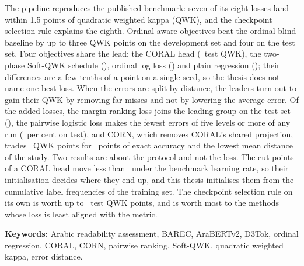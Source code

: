 \documentclass[12pt]{report}
\begin{document}
The pipeline reproduces the published benchmark: seven of its eight losses land within 1.5 points
of quadratic weighted kappa (QWK), and the checkpoint selection rule explains the eighth. Ordinal
aware objectives beat the ordinal-blind baseline by up to three QWK points on the development set
and four on the test set. Four objectives share the lead: the CORAL head (\testQwkCoral\ test
QWK), the two-phase Soft-QWK schedule (\testQwkSoftqwk), ordinal log loss (\testQwkOLL) and plain
regression (\testQwkMSE); their differences are a few tenths of a point on a single seed, so the
thesis does not name one best loss. When the errors are split by distance, the leaders turn out to
gain their QWK by removing far misses and not by lowering the average error. Of the added losses,
the margin ranking loss joins the leading group on the test set (\nlTestQwkRank), the pairwise
logistic loss makes the fewest errors of five levels or more of any run (\nlTestFarFivePlr\ per
cent on test), and CORN, which removes CORAL's shared projection, trades \nlAbsDeltaTestQwkCorn\
QWK points for \nlAbsDeltaTestAccCorn\ points of exact accuracy and the lowest mean distance of the
study. Two results are about the protocol and not the loss. The cut-points of a CORAL head move
less than \cutMoveFineCoral\ under the benchmark learning rate, so their initialisation decides
where they end up, and this thesis initialises them from the cumulative label frequencies of the
training set. The checkpoint selection rule on its own is worth up to \qwkselTestGainMax\ test QWK
points, and is worth most to the methods whose loss is least aligned with the metric.

{\textbf{Keywords:}} Arabic readability assessment, BAREC, AraBERTv2, D3Tok, ordinal regression,
CORAL, CORN, pairwise ranking, Soft-QWK, quadratic weighted kappa, error distance.

\tableofcontents









\end{document}
